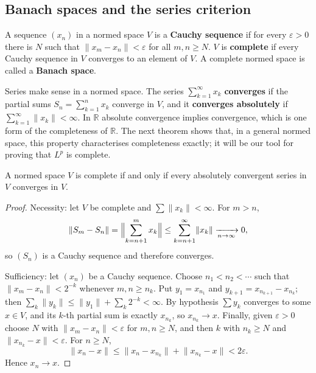 \documentclass[11pt]{article}
\newcommand{\R}{\mathbb{R}}
\newcommand{\norm}[1]{\lVert #1\rVert}
\begin{document}
\subsection{Banach spaces and the series criterion}

\begin{definition}
A sequence $(x_{n})$ in a normed space $V$ is a \textbf{Cauchy sequence} if for every $\varepsilon>0$ there is $N$ such that $\norm{x_{m}-x_{n}}<\varepsilon$ for all $m,n\ge N$. $V$ is \textbf{complete} if every Cauchy sequence in $V$ converges to an element of $V$. A complete normed space is called a \textbf{Banach space}.
\end{definition}

Series make sense in a normed space. The series $\sum_{k=1}^{\infty}x_{k}$ \textbf{converges} if the partial sums $S_{n}=\sum_{k=1}^{n}x_{k}$ converge in $V$, and it \textbf{converges absolutely} if $\sum_{k=1}^{\infty}\norm{x_{k}}<\infty$. In $\R$ absolute convergence implies convergence, which is one form of the completeness of $\R$. The next theorem shows that, in a general normed space, this property characterises completeness exactly; it will be our tool for proving that $L^{p}$ is complete.

\begin{theorem}\label{thm:series}
A normed space $V$ is complete if and only if every absolutely convergent series in $V$ converges in $V$.
\end{theorem}

\begin{proof}
Necessity: let $V$ be complete and $\sum\norm{x_{k}}<\infty$. For $m>n$,
\[
\norm{S_{m}-S_{n}}=\Bigl\|\sum_{k=n+1}^{m}x_{k}\Bigr\|\le\sum_{k=n+1}^{\infty}\norm{x_{k}}\xrightarrow[n\to\infty]{}0,
\]
so $(S_{n})$ is a Cauchy sequence and therefore converges.

Sufficiency: let $(x_{n})$ be a Cauchy sequence. Choose $n_{1}<n_{2}<\cdots$ such that $\norm{x_{m}-x_{n}}<2^{-k}$ whenever $m,n\ge n_{k}$. Put $y_{1}=x_{n_{1}}$ and $y_{k+1}=x_{n_{k+1}}-x_{n_{k}}$; then $\sum_{k}\norm{y_{k}}\le\norm{y_{1}}+\sum_{k}2^{-k}<\infty$. By hypothesis $\sum y_{k}$ converges to some $x\in V$, and its $k$-th partial sum is exactly $x_{n_{k}}$, so $x_{n_{k}}\to x$. Finally, given $\varepsilon>0$ choose $N$ with $\norm{x_{m}-x_{n}}<\varepsilon$ for $m,n\ge N$, and then $k$ with $n_{k}\ge N$ and $\norm{x_{n_{k}}-x}<\varepsilon$. For $n\ge N$,
\[
\norm{x_{n}-x}\le\norm{x_{n}-x_{n_{k}}}+\norm{x_{n_{k}}-x}<2\varepsilon .
\]
Hence $x_{n}\to x$.
\end{proof}
\end{document}
